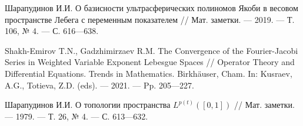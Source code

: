 \begin{thebibliography}{111}
Шарапудинов И.И.
О базисности ультрасферических полиномов Якоби в весовом пространстве Лебега с переменным показателем
//
Мат. заметки.
--- 2019.
--- Т. 106, № 4.
--- С. 616---638.

Shakh-Emirov T.N., Gadzhimirzaev R.M.
The Convergence of the Fourier-Jacobi Series in Weighted Variable Exponent Lebesgue Spaces
//
Operator Theory and Differential Equations. Trends in Mathematics. Birkhäuser, Cham.  In: Kusraev, A.G., Totieva, Z.D. (eds).
--- 2021.
--- Pp. 205---227.

Шарапудинов И.И.
О топологии пространства $L^{p(t)}([0,1])$
//
Мат. заметки.
--- 1979.
--- Т. 26, № 4.
--- С. 613---632.

\end{thebibliography} 